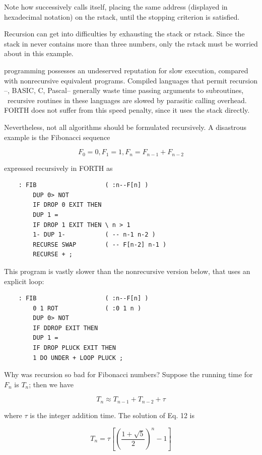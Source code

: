 Note how  successively calls itself, placing the same address (displayed in hexadecimal notation) on the rstack, until the stopping criterion is satisfied.

Recursion can get into difficulties by exhausting the stack or rstack. Since the stack in  never contains more than three numbers, only the rstack must be worried about in this example.

 programming possesses an undeserved reputation for slow execution, compared with nonrecursive equivalent programs. Compiled languages that permit recursion --\eg, BASIC, C, Pascal-- generally waste time passing arguments to subroutines, \ie~recursive routines in these languages are slowed by parasitic calling overhead. FORTH does not suffer from this speed penalty, since it uses the stack directly.

Nevertheless, not all algorithms should be formulated recursively. A disastrous example is the Fibonacci sequence

\begin{equation}
F_0 = 0, F_1 = 1, F_n = F_{n-1} + F_{n-2}
\end{equation}

expressed recursively in FORTH as
\begin{lstlisting}
    : FIB                   ( :n--F[n] )
        DUP 0> NOT
        IF DROP 0 EXIT THEN
        DUP 1 = 
        IF DROP 1 EXIT THEN \ n > 1
        1- DUP 1-           ( -- n-1 n-2 )
        RECURSE SWAP        ( -- F[n-2] n-1 )
        RECURSE + ;
\end{lstlisting}

This program is vastly slower than the nonrecursive version below, that uses an explicit  loop:
\begin{lstlisting}
    : FIB                   ( :n--F[n] )
        0 1 ROT             ( :0 1 n )
        DUP 0> NOT
        IF DDROP EXIT THEN
        DUP 1 =
        IF DROP PLUCK EXIT THEN
        1 DO UNDER + LOOP PLUCK ;
\end{lstlisting}
Why was recursion so bad for Fibonacci numbers? Suppose the running time for $F_n$ is $T_n$; then we have

\begin{equation}
T_{n} \approx T_{n-1} + T_{n-2} + \tau
\end{equation}

where $\tau$ is the integer addition time. The solution of Eq. 12 is

\begin{equation}
T_{n} = \tau\left[\left(\frac{1+\sqrt{5}}{2}\right)^n - 1\right]
\end{equation}

